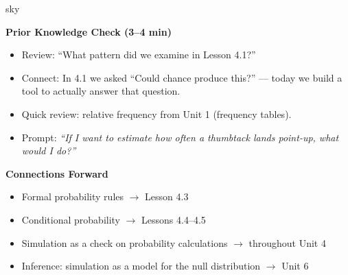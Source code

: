 \documentclass[10pt]{article}
\begin{document}
\begin{skillbox}{sky}
\begin{minipage}[t]{0.48\linewidth}
    \textbf{Prior Knowledge Check (3--4 min)}
    \begin{itemize}
        \item Review: ``What pattern did we examine in Lesson 4.1?''
        \item Connect: In 4.1 we asked ``Could chance produce this?'' --- today we build
              a tool to actually answer that question.
        \item Quick review: relative frequency from Unit 1 (frequency tables).
        \item Prompt: \textit{``If I want to estimate how often a thumbtack lands point-up,
              what would I do?''}
    \end{itemize}
\end{minipage}
\hfill
\begin{minipage}[t]{0.48\linewidth}
    \textbf{Connections Forward}
    \begin{itemize}
        \item Formal probability rules $\to$ Lesson 4.3
        \item Conditional probability $\to$ Lessons 4.4--4.5
        \item Simulation as a check on probability calculations $\to$ throughout Unit 4
        \item Inference: simulation as a model for the null distribution $\to$ Unit 6
    \end{itemize}
\end{minipage}
\end{skillbox}
\end{document}
